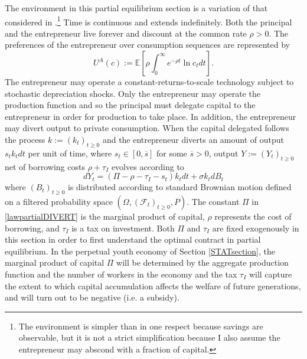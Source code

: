 \documentclass[11pt]{article}
\theoremstyle{plain}
\theoremstyle{definition} %
\begin{document}
The environment in this partial equilibrium section is a variation of that considered in \cite{di_tella_optimal_2021}.\footnote{The environment is simpler than \cite{di_tella_optimal_2021} in one respect because savings are observable, but it is not a strict simplification because I also assume the entrepreneur may abscond with a fraction of capital.} Time is continuous and extends indefinitely. Both the principal and the entrepreneur live forever and discount at the common rate $\rho > 0$. The preferences of the entrepreneur over consumption sequences are represented by 
$$
U^A(c) := \mathbb{E}{\left[\rho\int_0^{\infty} e^{-\rho t} \ln c_tdt\right]}.
$$
The entrepreneur may operate a constant-returns-to-scale technology subject to stochastic depreciation shocks. Only the entrepreneur may operate the production function and so the principal must delegate capital to the entrepreneur in order for production to take place. In addition, the entrepreneur may divert output to private consumption. When the capital delegated follows the process $k := (k_t)_{t\geq0}$ and the entrepreneur diverts an amount of output $s_tk_tdt$ per unit of time, where $s_t \in [0,\overline{s}]$ for some $\overline{s} > 0$, output $Y := (Y_t)_{t\geq0}$ net of borrowing costs $\rho + \tau_I$ evolves according to 
\begin{equation}
dY_t = (\Pi - \rho - \tau_I - s_t) k_t dt + \sigma k_t dB_t
\label{lawpartialDIVERT} 
\end{equation} 
where $(B_t)_{t\geq0}$ is distributed according to standard Brownian motion defined on a filtered probability space $(\Omega, (\mathcal{F}_t)_{t\geq0}, P)$. The constant $\Pi$ in \eqref{lawpartialDIVERT} is the marginal product of capital, $\rho$ represents the cost of borrowing, and $\tau_I$ is a tax on investment. Both $\Pi$ and $\tau_I$ are fixed exogenously in this section in order to first understand the optimal contract in partial equilibrium. In the perpetual youth economy of Section \ref{STATsection}, the marginal product of capital $\Pi$ will be determined by the aggregate production function and the number of workers in the economy and the tax $\tau_I$ will capture the extent to which capital accumulation affects the welfare of future generations, and will turn out to be negative (i.e. a subsidy).
\end{document}
